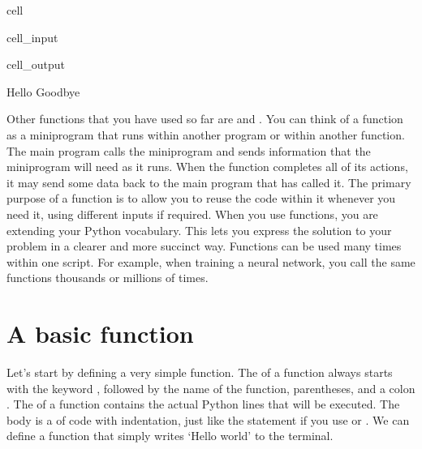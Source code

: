 \documentclass[letterpaper,10pt,english]{jupyterBook}
\begin{document}
\begin{sphinxuseclass}{cell}\begin{sphinxVerbatimInput}

\begin{sphinxuseclass}{cell_input}
\begin{sphinxVerbatim}[commandchars=\\\{\}]
\end{sphinxVerbatim}

\end{sphinxuseclass}\end{sphinxVerbatimInput}
\begin{sphinxVerbatimOutput}

\begin{sphinxuseclass}{cell_output}
\begin{sphinxVerbatim}[commandchars=\\\{\}]
Hello
Goodbye
\end{sphinxVerbatim}

\end{sphinxuseclass}\end{sphinxVerbatimOutput}

\end{sphinxuseclass}
\sphinxAtStartPar
Other functions that you have used so far are  and . You can think of a function as a mini\sphinxhyphen{}program that runs within another program or within another function. The main program calls the mini\sphinxhyphen{}program and sends information that the mini\sphinxhyphen{}program will need as it runs. When the function completes all of its actions, it may send some data back to the main program that has called it. The primary purpose of a function is to allow you to reuse the code within it whenever you need it, using different inputs if required. When you use functions, you are extending your Python vocabulary. This lets you express the solution to your problem in a clearer and more succinct way. Functions can be used many times within one script. For example, when training a neural network, you call the same functions thousands or millions of times.


\section{A basic function}
\label{\detokenize{notebooks/04_Functions/04_Functions_student:a-basic-function}}
\sphinxAtStartPar
Let’s start by defining a very simple function. The  of a function always starts with the keyword , followed by the name of the function, parentheses, and a colon \sphinxcode{\sphinxupquote{:}}. The  of a function contains the actual Python lines that will be executed. The body is a  of code with indentation, just like the statement if you use  or . We can define a function that simply writes ‘Hello world’ to the terminal.
\end{document}

